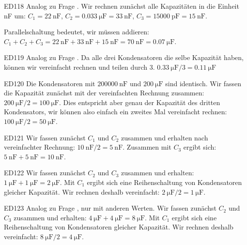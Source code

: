 \begin{sol}{ED118} 
Analog zu Frage .  
Wir rechnen zunächst alle Kapazitäten in die Einheit \si{\nano\farad} um:
 $C_1 = \SI{22}{\nano\farad}$, 
 $C_2 = \SI{0.033}{\micro\farad} = \SI{33}{\nano\farad}$, 
 $C_3 = \SI{15000}{\pico\farad} = \SI{15}{\nano\farad}$.

 Parallelschaltung bedeutet, wir müssen addieren: $C_1 + C_2 + C_3 = \SI{22}{\nano\farad} +\SI{33}{\nano\farad} + \SI{15}{\nano\farad} = \SI{70}{\nano\farad} = \SI{0,07}{\micro\farad}$.
\end{sol}


\begin{sol}{ED119} 
Analog zu Frage .  
Da alle drei Kondensatoren die selbe Kapazität haben, können wir vereinfacht rechnen und teilen durch 3. $\SI{0.33}{\micro\farad} / 3 = \SI{0.11}{\micro\farad}$
\end{sol}


\begin{sol}{ED120} 
Die Kondensatoren mit $\SI{200000}{\nano\farad}$ und $\SI{200}{\micro\farad}$ sind identisch.
Wir fassen die Kapazität zunächst mit der vereinfachten Rechnung zusammen:
$\SI{200}{\micro\farad} / 2 = \SI{100}{\micro\farad}$. Dies entspricht aber genau der Kapazität des dritten Kondensators, wir können also einfach ein zweites Mal vereinfacht rechnen: 
$\SI{100}{\micro\farad} / 2 = \SI{50}{\micro\farad}$.
\end{sol}

\begin{sol}{ED121} 
Wir fassen zunächst $C_1$ und $C_2$ zusammen und erhalten nach vereinfachter Rechnung: $\SI{10}{\nano\farad} / 2 = \SI{5}{\nano\farad}$. Zusammen mit $C_3$ ergibt sich: $\SI{5}{\nano\farad} + \SI{5}{\nano\farad} = \SI{10}{\nano\farad}$.
\end{sol}

\begin{sol}{ED122} 
Wir fassen zunächst $C_2$ und $C_3$ zusammen und erhalten: $\SI{1}{\micro\farad} + \SI{1}{\micro\farad} = \SI{2}{\micro\farad}$. 
Mit $C_1$ ergibt sich eine Reihenschaltung von Kondensatoren gleicher Kapazität. Wir rechnen deshalb vereinfacht:
 $\SI{2}{\micro\farad} / 2 = \SI{1}{\micro\farad}$.
\end{sol}

\begin{sol}{ED123} 
  Analog zu Frage , nur mit anderen Werten.
Wir fassen zunächst $C_2$ und $C_3$ zusammen und erhalten: $\SI{4}{\micro\farad} + \SI{4}{\micro\farad} = \SI{8}{\micro\farad}$. 
Mit $C_1$ ergibt sich eine Reihenschaltung von Kondensatoren gleicher Kapazität. Wir rechnen deshalb vereinfacht:
 $\SI{8}{\micro\farad} / 2 = \SI{4}{\micro\farad}$.
\end{sol}

